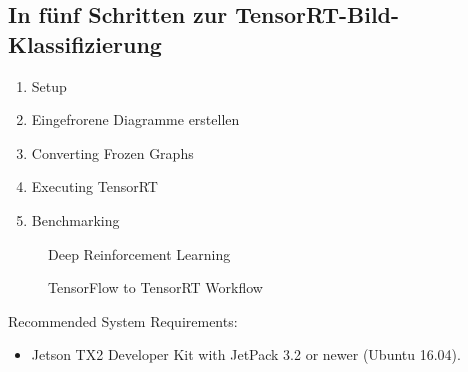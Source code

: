 {\bigskip

\subsection{In fünf Schritten zur TensorRT-Bild-Klassifizierung}


\begin{enumerate}
  \item Setup
  \item Eingefrorene Diagramme erstellen
  \item Converting Frozen Graphs
  \item Executing TensorRT
  \item Benchmarking
\end{enumerate}

\begin{figure}
	
	\caption{Deep Reinforcement Learning}
	
\end{figure}

\begin{figure}
	
	\caption{TensorFlow to TensorRT Workflow}
	
\end{figure}





Recommended System Requirements:

\begin{itemize}
  \item Jetson TX2 Developer Kit with JetPack 3.2 or newer (Ubuntu 16.04).
\end{itemize}
}
